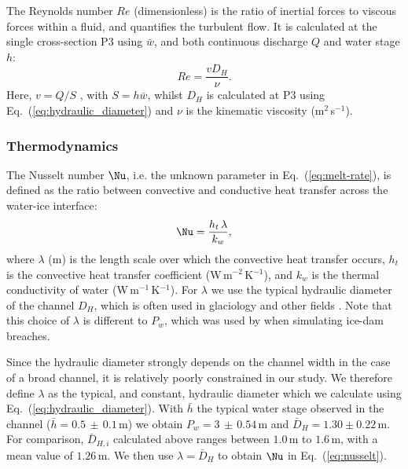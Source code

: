 The Reynolds number $Re$ (dimensionless) is the ratio of inertial forces to viscous forces within a fluid, and quantifies the turbulent flow. It is calculated at the single cross-section P3 using $\bar w$, and both continuous discharge $Q$ and water stage $h$:
\begin{equation}\label{eq:reynolds}
Re = \frac{{v} D_H}{\nu}.
\end{equation}
Here, $v = Q / S$ , with $S = h \bar w$, whilst $D_H$ is calculated at P3 using Eq.~(\ref{eq:hydraulic_diameter}) and $\nu$ is the kinematic viscosity (m$^2$\,s$^{-1}$).

\subsubsection{Thermodynamics}
\label{subsubsection:thermo}

The Nusselt number $\Nu$, i.e. the unknown parameter in Eq.~(\ref{eq:melt-rate}), is defined as the ratio between convective and conductive heat transfer across the water-ice interface:
%
\begin{equation}\label{eq:nusselt}
  \Nu = \frac{h_t \, \lambda}{k_w},
\end{equation}
where $\lambda$ (m) is the length scale over which the convective heat transfer occurs,  $h_t$ is the convective heat transfer coefficient (W\,m$^{-2}$\,K$^{-1}$), and $k_w$ is the thermal conductivity of water (W\,m$^{-1}$\,K$^{-1}$).
%
For $\lambda$ we use the typical hydraulic diameter of the channel $D_H$, which is often used in glaciology \citep{Clarke2003,Sommers&Rajaram2020} and other fields \citep{Incropera&al2007,Shah&London1978}. Note that this choice of $\lambda$ is different to $P_w$, which was used by \cite{Walder&Costa1996} when simulating ice-dam breaches.

Since the hydraulic diameter strongly depends on the channel width in the case of a broad channel, it is relatively poorly constrained in our study. We therefore define $\lambda$ as the typical, and constant, hydraulic diameter which we calculate using Eq.~(\ref{eq:hydraulic_diameter}). With $\bar h$ the typical water stage observed in the channel ($\bar h = 0.5\,\pm\,0.1$\,m) we obtain $P_w =3\,\pm\,0.54$\,m and $\bar D_H = 1.30 \pm 0.22$\,m. For comparison, $\bar D_{H,i}$ calculated above ranges between $1.0$\,m to $1.6$\,m, with a mean value of $1.26$\,m. We then use $\lambda = \bar D_H$ to obtain $\Nu$ in Eq.~(\ref{eq:nusselt}).

